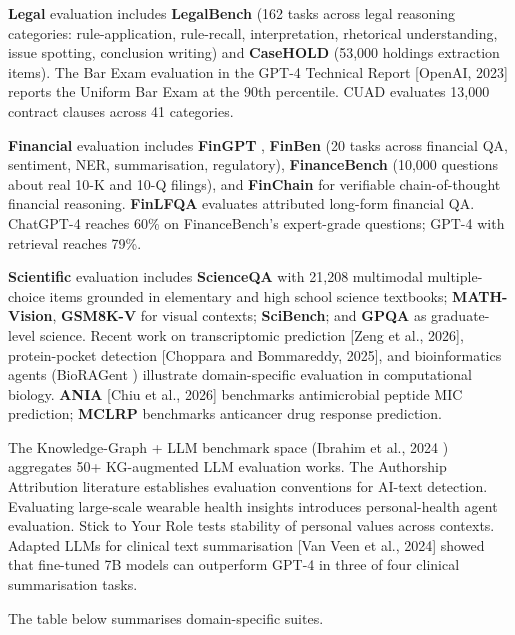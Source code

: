 \documentclass{article}
\begin{document}
\textbf{Legal} evaluation includes \textbf{LegalBench} (162 tasks across legal reasoning categories: rule-application, rule-recall, interpretation, rhetorical understanding, issue spotting, conclusion writing) and \textbf{CaseHOLD} (53,000 holdings extraction items). The Bar Exam evaluation in the GPT-4 Technical Report {[}OpenAI, 2023{]} reports the Uniform Bar Exam at the 90th percentile. CUAD evaluates 13,000 contract clauses across 41 categories.

\textbf{Financial} evaluation includes \textbf{FinGPT} \cite{wang20232023}, \textbf{FinBen} (20 tasks across financial QA, sentiment, NER, summarisation, regulatory), \textbf{FinanceBench} (10,000 questions about real 10-K and 10-Q filings), and \textbf{FinChain} \cite{xie20252025} for verifiable chain-of-thought financial reasoning. \textbf{FinLFQA} \cite{long20252025} evaluates attributed long-form financial QA. ChatGPT-4 reaches 60\% on FinanceBench's expert-grade questions; GPT-4 with retrieval reaches 79\%.

\textbf{Scientific} evaluation includes \textbf{ScienceQA} \cite{lu2022learntoexplainmult} with 21,208 multimodal multiple-choice items grounded in elementary and high school science textbooks; \textbf{MATH-Vision}, \textbf{GSM8K-V} for visual contexts; \textbf{SciBench}; and \textbf{GPQA} as graduate-level science. Recent work on transcriptomic prediction {[}Zeng et al., 2026{]}, protein-pocket detection {[}Choppara and Bommareddy, 2025{]}, and bioinformatics agents (BioRAGent \cite{bi20252025}) illustrate domain-specific evaluation in computational biology. \textbf{ANIA} {[}Chiu et al., 2026{]} benchmarks antimicrobial peptide MIC prediction; \textbf{MCLRP} \cite{wang2025reasoningonmultipl} benchmarks anticancer drug response prediction.

The Knowledge-Graph + LLM benchmark space (Ibrahim et al., 2024 \cite{ibrahim20242024}) aggregates 50+ KG-augmented LLM evaluation works. The Authorship Attribution literature \cite{huang2024authorshipattribut} establishes evaluation conventions for AI-text detection. Evaluating large-scale wearable health insights \cite{merrill20262026} introduces personal-health agent evaluation. Stick to Your Role \cite{kova20242024} tests stability of personal values across contexts. Adapted LLMs for clinical text summarisation {[}Van Veen et al., 2024{]} showed that fine-tuned 7B models can outperform GPT-4 in three of four clinical summarisation tasks.

The table below summarises domain-specific suites.
\end{document}
